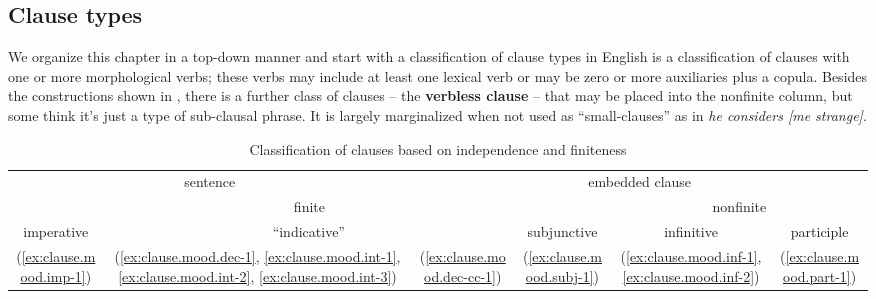 \documentclass[UTF8, a4paper, oneside, scheme=plain, 12pt]{ctexbook}
\newcommand*{\citepage}[1]{p.~{#1}}
\newcommand*{\concept}[1]{\textbf{#1}}
\newcommand{\form}[1]{\emph{#1}}
\begin{document}
\subsection{Clause types}\label{sec:moods}

We organize this chapter in a top-down manner and 
start with a classification of clause types in English
 is a classification of clauses with one or more morphological verbs;
these verbs may include at least one lexical verb 
or may be zero or more auxiliaries plus a copula.
Besides the constructions shown in ,
there is a further class of clauses 
-- the \concept{verbless clause} \citep[\citepage{1266}]{cgel} -- 
that may be placed into the nonfinite column,
but some think it's just a type of sub-clausal phrase.
It is largely marginalized when not used as ``small-clauses'' 
as in \form{he considers [me strange]}.

\begin{table}[H]
    \caption{Classification of clauses based on independence and finiteness}
    \label{tbl:verbal-clause}
    \centering
    \begin{tabular}{@{}cccccc@{}}
        \toprule
        \multicolumn{2}{c}{sentence}            & \multicolumn{4}{c}{ embedded clause}                                                                \\ \cmidrule(lr){1-2} \cmidrule(lr){3-6}
        \multicolumn{4}{c}{finite}                                                                & \multicolumn{2}{c}{nonfinite}                         \\ \cmidrule(lr){1-4} \cmidrule(lr){5-6}
        imperative               & \multicolumn{2}{c}{``indicative''} & subjunctive & infinitive           & participle \\ \midrule
        (\ref{ex:clause.mood.imp-1})    &  
        (\ref{ex:clause.mood.dec-1}, \ref{ex:clause.mood.int-1}, \ref{ex:clause.mood.int-2}, \ref{ex:clause.mood.int-3})                 &   
        (\ref{ex:clause.mood.dec-cc-1})         &           
        (\ref{ex:clause.mood.subj-1})                & 
        (\ref{ex:clause.mood.inf-1},\ref{ex:clause.mood.inf-2})  &        
        (\ref{ex:clause.mood.part-1})                       \\ \bottomrule
    \end{tabular}
\end{table}
\end{document}
